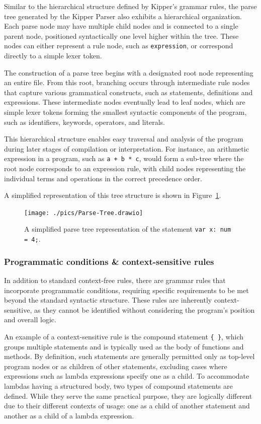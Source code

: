 Similar to the hierarchical structure defined by Kipper's grammar rules, the parse tree generated by the Kipper Parser also exhibits a hierarchical organization. Each parse node may have multiple child nodes and is connected to a single parent node, positioned syntactically one level higher within the tree. These nodes can either represent a rule node, such as \lstinline|expression|, or correspond directly to a simple lexer token.

The construction of a parse tree begins with a designated root node representing an entire file. From this root, branching occurs through intermediate rule nodes that capture various grammatical constructs, such as statements, definitions and expressions. These intermediate nodes eventually lead to leaf nodes, which are simple lexer tokens forming the smallest syntactic components of the program, such as identifiers, keywords, operators, and literals.

This hierarchical structure enables easy traversal and analysis of the program during later stages of compilation or interpretation. For instance, an arithmetic expression in a program, such as \lstinline|a + b * c|, would form a sub-tree where the root node corresponds to an expression rule, with child nodes representing the individual terms and operations in the correct precedence order.

A simplified representation of this tree structure is shown in Figure~\ref{fig:implementation:parse-tree}.

\begin{figure}[h!]
	\centering
	\texttt{[image: ./pics/Parse-Tree.drawio]}
	\caption{A simplified parse tree representation of the statement \lstinline|var x: num = 4;|.}
	\label{fig:implementation:parse-tree}
\end{figure}

\subsubsection{Programmatic conditions \& context-sensitive rules}

In addition to standard context-free rules, there are grammar rules that incorporate programmatic conditions, requiring specific requirements to be met beyond the standard syntactic structure. These rules are inherently context-sensitive, as they cannot be identified without considering the program’s position and overall logic.

An example of a context-sensitive rule is the compound statement \lstinline|{ }|, which groups multiple statements and is typically used as the body of functions and methods. By definition, such statements are generally permitted only as top-level program nodes or as children of other statements, excluding cases where expressions such as lambda expressions specify one as a child. To accommodate lambdas having a structured body, two types of compound statements are defined. While they serve the same practical purpose, they are logically different due to their different contexts of usage: one as a child of another statement and another as a child of a lambda expression.

